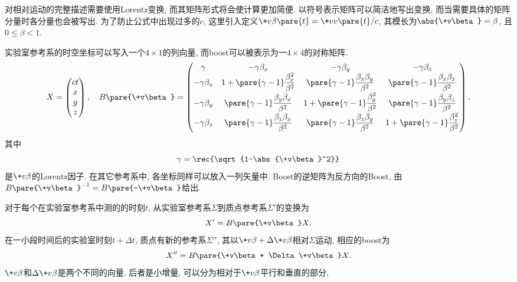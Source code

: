 \documentclass[hidelinks]{ctexart}
\begin{document}
对相对运动的完整描述需要使用Lorentz变换, 而其矩阵形式将会使计算更加简便. 以符号表示矩阵可以简洁地写出变换, 而当需要具体的矩阵分量时各分量也会被写出. 为了防止公式中出现过多的$c$, 这里引入定义$\+v\beta\pare{t} = \+vv\pare{t}/c$, 其模长为$\abs{\+v\beta} = \beta$, 且$0\le \beta < 1$.
\par
实验室参考系的时空坐标可以写入一个$4\times 1$的列向量, 而boost可以被表示为一$4\times 4$的对称矩阵.
\[ X = \begin{pmatrix}
    ct\\ x\\ y\\ z
\end{pmatrix},\quad B\pare{\+v\beta} = \begin{pmatrix}
    \displaystyle \gamma & -\gamma\beta_x & -\gamma\beta_y & -\gamma\beta_z \\
    \displaystyle -\gamma\beta_x & \displaystyle 1+\pare{\gamma - 1}\frac{\beta_x^2}{\beta^2} & \displaystyle \pare{\gamma-1}\frac{\beta_x \beta_y}{\beta^2} &\displaystyle  \pare{\gamma - 1}\frac{\beta_x \beta_z}{\beta^2} \\
    \displaystyle -\gamma\beta_y & \displaystyle \pare{\gamma - 1}\frac{\beta_y\beta_x}{\beta^2} & \displaystyle 1+\pare{\gamma-1}\frac{\beta_y^2}{\beta^2} & \displaystyle \pare{\gamma - 1}\frac{\beta_y \beta_z}{\beta^2} \\
    \displaystyle -\gamma\beta_z & \displaystyle \pare{\gamma - 1}\frac{\beta_z\beta_x}{\beta^2} &\displaystyle  \pare{\gamma-1}\frac{\beta_z \beta_y}{\beta^2} &\displaystyle  1+\pare{\gamma - 1}\frac{\beta_z^2}{\beta^2} \\
\end{pmatrix}. \]
其中
\[ \gamma = \rec{\sqrt{1-\abs{\+v\beta}^2}} \]
是$\+v\beta$的Lorentz因子. 在其它参考系中, 各坐标同样可以放入一列矢量中. Boost的逆矩阵为反方向的Boost, 由$B\pare{\+v\beta}^{-1} = B\pare{-\+v\beta}$给出.
\par
对于每个在实验室参考系中测的的时刻$t$, 从实验室参考系$\Sigma$到质点参考系$\Sigma'$的变换为
\begin{equation}
    \label{eq:第一boost}
    X' = B\pare{\+v\beta}X.
\end{equation}
在一小段时间后的实验室时刻$t+\Delta t$, 质点有新的参考系$\Sigma''$, 其以$\+v\beta + \Delta \+v\beta$相对$\Sigma$运动, 相应的boost为
\begin{equation}
    \label{eq:第二boost}
    X'' = B\pare{\+v\beta + \Delta \+v\beta} X.
\end{equation}
$\+v\beta$和$\Delta \+v\beta$是两个不同的向量. 后者是小增量, 可以分为相对于$\+v\beta$平行和垂直的部分,
\end{document}
